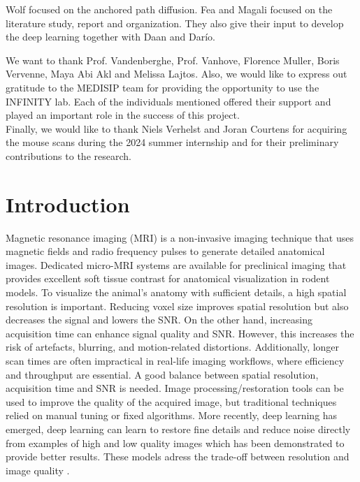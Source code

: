 \documentclass[twocolumn]{article}
\begin{document}
Wolf focused on the anchored path diffusion. Fea and Magali focused on the literature study, report and organization. 
They also give their input to develop the deep learning together with Daan and Darío.

We want to thank Prof. Vandenberghe, Prof. Vanhove, Florence Muller, Boris Vervenne, Maya Abi Akl and Melissa Lajtos. 
Also, we would like to express out gratitude to the MEDISIP team for providing the opportunity to use the INFINITY lab. 
Each of the individuals mentioned offered their support and played an important role in the success of this project. \\

Finally, we would like to thank Niels Verhelst and Joran Courtens for acquiring the mouse scans during the 2024 summer internship and for their preliminary contributions to the research.



\twocolumn
\section{Introduction}

Magnetic resonance imaging (MRI) is a non‐invasive imaging technique that uses magnetic fields and radio frequency pulses to generate detailed anatomical images. 
Dedicated micro-MRI systems are available for preclinical imaging that provides excellent soft tissue contrast for anatomical visualization in rodent models. 
To visualize the animal's anatomy with sufficient details, a high spatial resolution is important. Reducing voxel size improves spatial resolution but also decreases the signal and lowers the SNR. 
On the other hand, increasing acquisition time can enhance signal quality and SNR. However, this increases the risk of artefacts, blurring, and motion-related distortions. 
Additionally, longer scan times are often impractical in real-life imaging workflows, where efficiency and throughput are essential. 
A good balance between spatial resolution, acquisition time and SNR is needed.
Image processing/restoration tools can be used to improve the quality of the acquired image, but traditional techniques relied on manual tuning or fixed
algorithms. More recently, deep learning has emerged, deep learning can learn to restore fine details and reduce noise directly from
examples of high and low quality images which has been demonstrated to provide better results. These models adress the trade-off between resolution and image quality \cite{brown2014magnetic}. 
\end{document}
